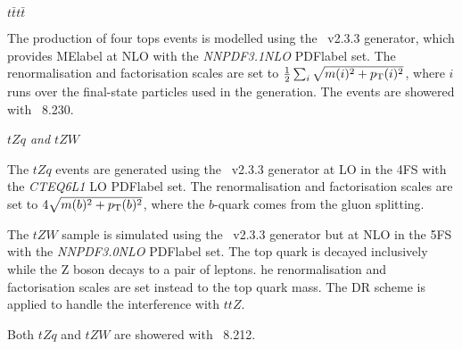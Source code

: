 \textit{$t\bar{t}t\bar{t}$}

The production of four tops events is modelled using the \MGMCatNLO~v2.3.3 generator, which provides \acrshort{MElabel} at NLO with the \textit{NNPDF3.1NLO} \acrshort{PDFlabel} set. The renormalisation and factorisation scales are set to $\frac{1}{2}\sum_i\sqrt{m(i)^2+p_{\text{T}}(i)^2}$, where $i$ runs over the final-state particles used in the generation. The events are showered with \PYTHIA~8.230.

\textit{$tZq$ and $tZW$}

The $tZq$ events are generated using the \MGMCatNLO~v2.3.3 generator at LO in the 4FS with the \textit{CTEQ6L1} LO \acrshort{PDFlabel} set. The renormalisation and factorisation scales are set to $4\sqrt{m(b)^2+p_{\text{T}}(b)^2}$, where the $b$-quark comes from the gluon splitting.

The $tZW$ sample is simulated using the \MGMCatNLO~v2.3.3 generator but at NLO in the 5FS with the \textit{NNPDF3.0NLO} \acrshort{PDFlabel} set. The top quark is decayed inclusively while the Z boson decays to a pair of leptons. he renormalisation and factorisation scales are set instead to the top quark mass. The DR scheme is applied to handle the interference with $ttZ$.

Both $tZq$ and $tZW$ are showered with \PYTHIA~8.212.